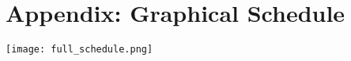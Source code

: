 \section{Appendix: Graphical Schedule}
\label{appendix:schedule}

\newpage
\begin{landscape}
	\centering
	{\texttt{[image: full\_schedule.png]}}
\end{landscape}